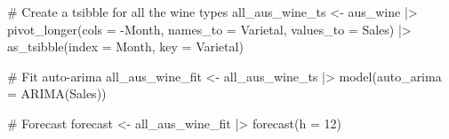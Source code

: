 \documentclass[
  letterpaper,
  DIV=11,
  numbers=noendperiod]{scrartcl}
\newenvironment{Shaded}{\begin{snugshade}}{\end{snugshade}}
\newcommand{\AttributeTok}[1]{\textcolor[rgb]{0.40,0.45,0.13}{#1}}
\newcommand{\CommentTok}[1]{\textcolor[rgb]{0.37,0.37,0.37}{#1}}
\newcommand{\DecValTok}[1]{\textcolor[rgb]{0.68,0.00,0.00}{#1}}
\newcommand{\FunctionTok}[1]{\textcolor[rgb]{0.28,0.35,0.67}{#1}}
\newcommand{\NormalTok}[1]{\textcolor[rgb]{0.00,0.23,0.31}{#1}}
\newcommand{\OtherTok}[1]{\textcolor[rgb]{0.00,0.23,0.31}{#1}}
\newcommand{\SpecialCharTok}[1]{\textcolor[rgb]{0.37,0.37,0.37}{#1}}
\newcommand{\StringTok}[1]{\textcolor[rgb]{0.13,0.47,0.30}{#1}}
\begin{document}
\begin{Shaded}
\begin{Highlighting}[]
\CommentTok{\# Create a tsibble for all the wine types}
\NormalTok{all\_aus\_wine\_ts }\OtherTok{\textless{}{-}}\NormalTok{ aus\_wine }\SpecialCharTok{|\textgreater{}}
  \FunctionTok{pivot\_longer}\NormalTok{(}\AttributeTok{cols =} \SpecialCharTok{{-}}\NormalTok{Month, }\AttributeTok{names\_to =} \StringTok{\textquotesingle{}Varietal\textquotesingle{}}\NormalTok{, }\AttributeTok{values\_to =} \StringTok{\textquotesingle{}Sales\textquotesingle{}}\NormalTok{) }\SpecialCharTok{|\textgreater{}}
  \FunctionTok{as\_tsibble}\NormalTok{(}\AttributeTok{index =}\NormalTok{ Month, }\AttributeTok{key =} \StringTok{\textquotesingle{}Varietal\textquotesingle{}}\NormalTok{)}

\CommentTok{\# Fit auto{-}arima}
\NormalTok{all\_aus\_wine\_fit }\OtherTok{\textless{}{-}}\NormalTok{ all\_aus\_wine\_ts }\SpecialCharTok{|\textgreater{}} \FunctionTok{model}\NormalTok{(}\AttributeTok{auto\_arima =} \FunctionTok{ARIMA}\NormalTok{(Sales))}

\CommentTok{\# Forecast}
\NormalTok{forecast }\OtherTok{\textless{}{-}}\NormalTok{ all\_aus\_wine\_fit }\SpecialCharTok{|\textgreater{}} \FunctionTok{forecast}\NormalTok{(}\AttributeTok{h =} \DecValTok{12}\NormalTok{)}


\end{Highlighting}
\end{Shaded}
\end{document}
